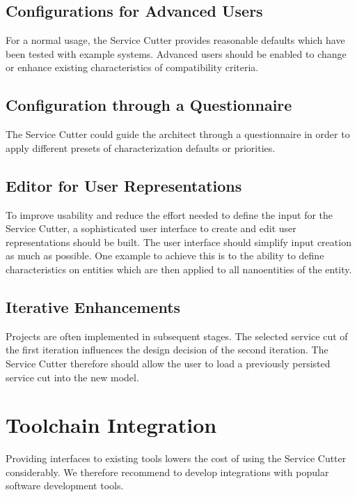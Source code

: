 \subsection{Configurations for Advanced Users}

For a normal usage, the Service Cutter provides reasonable defaults which have been tested with example systems. Advanced users should be enabled to change or enhance existing characteristics of compatibility criteria.

\subsection{Configuration through a Questionnaire}

The Service Cutter could guide the architect through a questionnaire in order to apply different presets of characterization defaults or priorities.

\subsection{Editor for User Representations}

To improve usability and reduce the effort needed to define the input for the Service Cutter, a sophisticated user interface to create and edit user representations should be built. The user interface should simplify input creation as much as possible. One example to achieve this is to the ability to define characteristics on entities which are then applied to all nanoentities of the entity. 

\subsection{Iterative Enhancements}
Projects are often implemented in subsequent stages. The selected service cut of the first iteration influences the design decision of the second iteration. The Service Cutter therefore should allow the user to load a previously persisted service cut into the new model.

\section{Toolchain Integration}

Providing interfaces to existing tools lowers the cost of using the Service Cutter considerably. We therefore recommend to develop integrations with popular software development tools.

